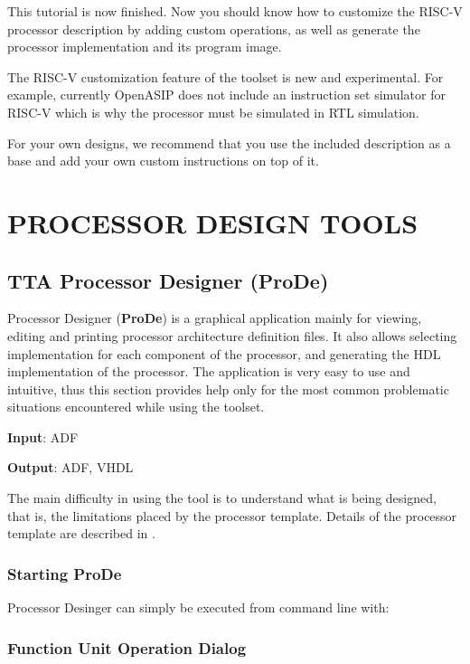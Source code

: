 \documentclass[a4paper,twoside]{tceusermanual}
\begin{document}
This tutorial is now finished. Now you should know how to customize
the RISC-V processor description by adding custom operations,
as well as generate the processor implementation and its program image.

The RISC-V customization feature of the toolset is new and experimental.
For example, currently OpenASIP does not include an instruction set simulator
for RISC-V which is why the processor must be simulated in RTL simulation.

For your own designs, we recommend that you use the included 
description as a base and add your own custom instructions on top of it.

\chapter{PROCESSOR DESIGN TOOLS}
\label{chapter:procgen}

\section{TTA Processor Designer (ProDe)}
\label{sec:prode}

Processor Designer (\textbf{ProDe}) is a graphical application mainly for
viewing, editing and printing processor architecture definition files. 
It also allows selecting implementation for each component of the processor,
and generating the HDL implementation of the processor. The application is
very easy to use and intuitive, thus this section provides help only for the
most common problematic situations encountered while using the toolset.

\textbf{Input}: ADF

\textbf{Output}: ADF, VHDL

The main difficulty in using the tool is to understand what is being
designed, that is, the limitations placed by the processor template. 
Details of the processor template are described in \cite{ADF-specs}.


\subsection{Starting ProDe}

Processor Desinger can simply be executed from command line with:


\subsection{Function Unit Operation Dialog}
\end{document}
